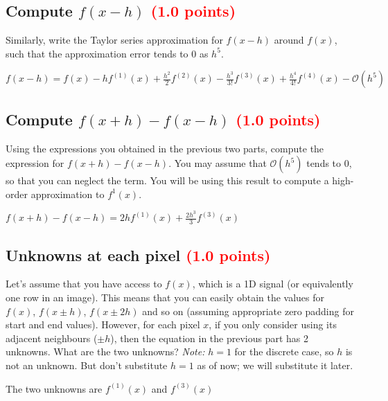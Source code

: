 \documentclass[answers]{exam}
\newcommand{\mypoints}[1]{\textcolor{red}{(#1 points)}}
\begin{document}
\subsection{Compute $f(x-h)$ \mypoints{1.0}}
Similarly, write the Taylor series approximation for $f(x-h)$ around $f(x)$, such that the approximation error tends to 0 as $h^5$.
\begin{solution}
$
f(x-h)=f(x)-h f^{(1)}(x)+\frac{h^{2}}{2} f^{(2)}(x)-\frac{h^{3}}{3 !} f^{(3)}(x)+\frac{h^{4}}{4 !} f^{(4)}(x)-\mathcal O\left(h^{5}\right)
$
\end{solution}

\subsection{Compute $f(x+h)-f(x-h)$ \mypoints{1.0}}
\label{difference}
Using the expressions you obtained in the previous two parts, compute the expression for $f(x+h)-f(x-h)$. You may assume that $\mathcal{O}(h^5)$ tends to 0, so that you can neglect the term. You will be using this result to compute a high-order approximation to $f^{1}(x)$.
\begin{solution}
$
f(x+h)-f(x-h)=2 h f^{(1)}(x)+\frac{2h^{3}}{3} f^{(3)}(x)
$
\end{solution}

\subsection{Unknowns at each pixel \mypoints{1.0}}
\label{unknowns}
Let's assume that you have access to $f(x)$, which is a 1D signal (or equivalently one row in an image). This means that you can easily obtain the values for $f(x)$, $f(x \pm h)$, $f(x \pm 2h)$ and so on (assuming appropriate zero padding for start and end values). However, for each pixel $x$, if you only consider using its adjacent neighbours ($\pm h$), then the equation in the previous part has 2 unknowns. What are the two unknowns?
\textit{Note:} $h=1$ for the discrete case, so $h$ is not an unknown. But don't substitute $h=1$ as of now; we will substitute it later.
\begin{solution}
The two unknowns are $f^{(1)}(x)$ and $f^{(3)}(x)$
\end{solution}
\end{document}
